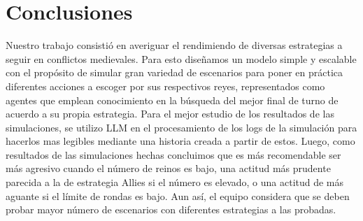 \documentclass[11pt]{article}
\begin{document}
        \newpage

        \section{Conclusiones}
        Nuestro trabajo consistió en averiguar el rendimiendo de diversas estrategias a seguir en conflictos 
        medievales. Para esto diseñamos un modelo simple y escalable con el propósito de simular gran variedad 
        de escenarios para poner en práctica diferentes acciones a escoger por sus respectivos reyes, representados 
        como agentes que emplean conocimiento en la búsqueda del mejor final de turno de acuerdo a su propia 
        estrategia. Para el mejor estudio de los resultados de las simulaciones, se utilizo LLM en el procesamiento 
        de los logs de la simulación para hacerlos mas legibles mediante una historia creada a partir de estos. Luego, 
        como resultados de las simulaciones hechas concluimos que es más recomendable ser más agresivo cuando el número 
        de reinos es bajo, una actitud más prudente parecida a la de estrategia Allies si el número es elevado, o una 
        actitud de más aguante si el límite de rondas es bajo. Aun así, el equipo considera que se deben probar mayor 
        número de escenarios con diferentes estrategias a las probadas.
        
\end{document}
